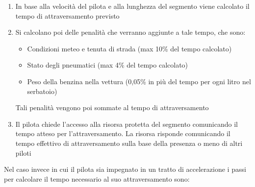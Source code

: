 \documentclass[a4paper,11pt, twoside]{book}
\begin{document}
	  \begin{enumerate}
	    \item In base alla velocità del pilota e alla lunghezza del segmento viene calcolato il tempo di attraversamento previsto
	    \item Si calcolano poi delle penalità che verranno aggiunte a tale tempo, che sono:
		  \begin{itemize}
		    \item Condizioni meteo e tenuta di strada (max 10\% del tempo calcolato)
		    \item Stato degli pneumatici (max 4\% del tempo calcolato)
		    \item Peso della benzina nella vettura (0,05\% in più del tempo per ogni litro nel serbatoio)
		  \end{itemize}
		  Tali penalità vengono poi sommate al tempo di attraversamento
	    \item Il pilota chiede l'accesso alla risorsa protetta del segmento
		  comunicando il tempo atteso per l'attraversamento. La risorsa risponde comunicando il tempo
		  effettivo di attraversamento sulla base della presenza o meno di altri piloti
	  \end{enumerate}
	  
	  Nel caso invece in cui il pilota sia impegnato in un tratto di accelerazione i passi
	  per calcolare il tempo necessario al suo attraversamento sono:
	  
\end{document}
